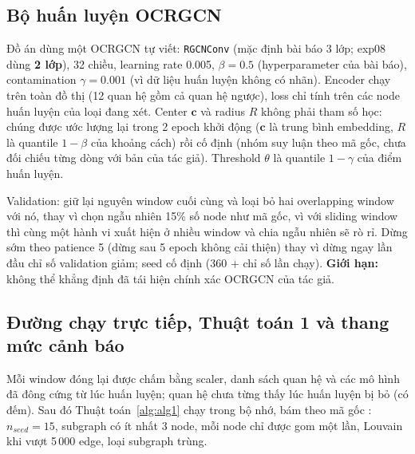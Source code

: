 \subsection{Bộ huấn luyện OCRGCN}
\label{sec:dev-trainer}

Đồ án dùng một OCRGCN tự viết: \texttt{RGCNConv} (mặc định bài báo 3 lớp; exp08 dùng \textbf{2 lớp}), 32 chiều, learning rate 0.005, $\beta = 0.5$ (hyperparameter của bài báo), contamination $\gamma = 0.001$ (vì dữ liệu huấn luyện không có nhãn). Encoder chạy trên toàn đồ thị (12 quan hệ gồm cả quan hệ ngược), loss chỉ tính trên các node huấn luyện của loại đang xét. Center $\mathbf{c}$ và radius $R$ không phải tham số học: chúng được ước lượng lại trong 2 epoch khởi động ($\mathbf{c}$ là trung bình embedding, $R$ là quantile $1 - \beta$ của khoảng cách) rồi cố định (nhóm suy luận theo mã gốc, chưa đối chiếu từng dòng với bản của tác giả). Threshold $\theta$ là quantile $1 - \gamma$ của điểm huấn luyện.

Validation: giữ lại nguyên window cuối cùng và loại bỏ hai overlapping window với nó, thay vì chọn ngẫu nhiên 15\% số node như mã gốc, vì với sliding window thì cùng một hành vi xuất hiện ở nhiều window và chia ngẫu nhiên sẽ rò rỉ. Dừng sớm theo patience 5 (dừng sau 5 epoch không cải thiện) thay vì dừng ngay lần đầu chỉ số validation giảm; seed cố định (360 + chỉ số lần chạy). \textbf{Giới hạn:} không thể khẳng định đã tái hiện chính xác OCRGCN của tác giả.

\subsection{Đường chạy trực tiếp, Thuật toán 1 và thang mức cảnh báo}
\label{sec:dev-live}

Mỗi window đóng lại được chấm bằng scaler, danh sách quan hệ và các mô hình đã đông cứng từ lúc huấn luyện; quan hệ chưa từng thấy lúc huấn luyện bị bỏ (có đếm). Sau đó Thuật toán~\ref{alg:alg1} chạy trong bộ nhớ, bám theo mã gốc \cite{ocrapt_repo}: $n_{seed} = 15$, subgraph có ít nhất 3 node, mỗi node chỉ được gom một lần, Louvain khi vượt 5\,000 edge, loại subgraph trùng.

